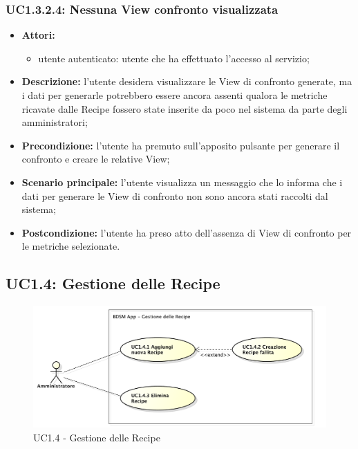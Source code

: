 \subsubsection{UC1.3.2.4: Nessuna View confronto visualizzata}
\begin{itemize}
	\item \textbf{Attori:}
	\begin{itemize}
		\item utente autenticato: utente che ha effettuato l'accesso al servizio;
	\end{itemize}
	\item \textbf{Descrizione:} l'utente desidera visualizzare le View di confronto generate, ma i dati per generarle potrebbero essere ancora assenti qualora le metriche ricavate dalle Recipe fossero state inserite da poco nel sistema da parte degli amministratori;
	\item \textbf{Precondizione:} l'utente ha premuto sull'apposito pulsante per generare il confronto e creare le relative View;
	\item \textbf{Scenario principale:} l'utente visualizza un messaggio che lo informa che i dati per generare le View di confronto non sono ancora stati raccolti dal sistema;
	\item \textbf{Postcondizione:} l'utente ha preso atto dell'assenza di View di confronto per le metriche selezionate.
\end{itemize}

\pagebreak


\subsection{UC1.4: Gestione delle Recipe}
\begin{figure}[!ht]
	\centering
	\centerline{\includegraphics[scale=0.45]{./images/UC1_4.pdf}}
	\caption{UC1.4 - Gestione delle Recipe}
\end{figure}

